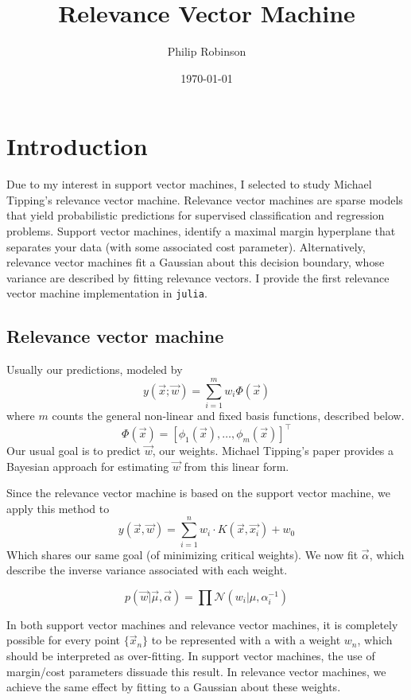 \documentclass[11pt]{article} %
\title{Relevance Vector Machine}
\date{\today}
\author{Philip Robinson}
\affil{Oregon Health Sciences University}
\def\rv{relevance vector\xspace}
\def\RVM{Relevance vector machine\xspace}
\def\rvm{\rv machine\xspace}
\def\SVM{Support vector machine\xspace}
\def\svm{support vector machine\xspace}
\def\julia{\texttt{julia}\xspace}
\def\MT{Michael Tipping\xspace}
\begin{document}
\maketitle


\section{Introduction}
Due to my interest in \svm{}s, I selected to study \MT's \rvm.
\RVM{}s are sparse models that yield probabilistic predictions
for supervised classification and regression problems. \SVM{}s,
identify a maximal margin hyperplane that separates your data
(with some associated cost parameter). Alternatively, \rvm{}s
fit a Gaussian about this decision boundary, whose variance
are described by fitting \rv{}s. I provide the first \rvm
implementation in \julia.

\subsection{\RVM}
Usually our predictions, modeled by
\[y(\vec{x}; \vec{w}) = \sum_{i=1}^m w_i \Phi(\vec{x})\]
where $m$ counts the general non-linear and fixed basis
functions, described below.
\[\Phi(\vec{x}) = \left[\phi_1(\vec{x}), \dots, \phi_m(\vec{x})\right]^\intercal\]
Our usual goal is to predict $\vec{w}$, our weights.
\MT's paper provides a Bayesian approach for estimating
$\vec{w}$ from this linear form.

Since the \rvm is based on the \svm, we apply this method to
\[y(\vec{x},\vec{w})=\sum_{i=1}^n w_i\cdot K(\vec{x}, \vec{x_i}) + w_0\]
Which shares our same goal (of minimizing critical weights).
We now fit $\vec{\alpha}$, which describe the inverse variance
associated with each weight.

\[p(\vec{w}|\vec{\mu},\vec{\alpha}) = \prod\mathcal{N}(w_i |\mu,\alpha_i^{-1})\]

In both \svm{}s and \rvm{}s, it is completely possible for
every point \(\{\vec{x}_n\}\) to be represented with a with a
weight $w_n$, which should be interpreted as over-fitting. In
\svm{}s, the use of margin/cost parameters dissuade this result.
In \rvm{}s, we achieve the same effect by fitting to a Gaussian
about these weights.
\end{document}
